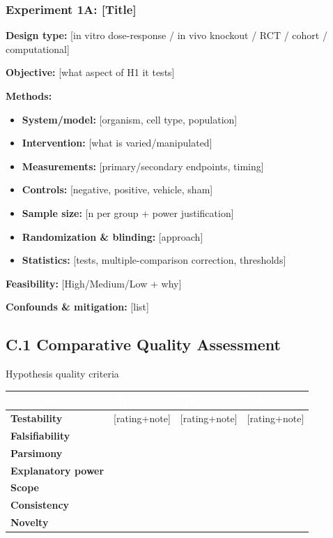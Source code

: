 \documentclass[11pt,letterpaper]{article}
\begin{document}
\subsubsection*{Experiment 1A: [Title]}
\textbf{Design type:} [in vitro dose-response / in vivo knockout / RCT / cohort / computational]\par
\textbf{Objective:} [what aspect of H1 it tests]\par
\textbf{Methods:}
\begin{itemize}
  \item \textbf{System/model:} [organism, cell type, population]
  \item \textbf{Intervention:} [what is varied/manipulated]
  \item \textbf{Measurements:} [primary/secondary endpoints, timing]
  \item \textbf{Controls:} [negative, positive, vehicle, sham]
  \item \textbf{Sample size:} [n per group + power justification]
  \item \textbf{Randomization \& blinding:} [approach]
  \item \textbf{Statistics:} [tests, multiple-comparison correction, thresholds]
\end{itemize}
\textbf{Feasibility:} [High/Medium/Low + why]\par
\textbf{Confounds \& mitigation:} [list]

\newpage
{}
\subsection*{C.1 Comparative Quality Assessment}
\begin{hypotable}{Hypothesis quality criteria}
\begin{tabular}{|p{2.5cm}|p{3cm}|p{3cm}|p{3cm}|}
\hline\tableheadercolor
\textcolor{white}{\textbf{Criterion}} & \textcolor{white}{\textbf{H1}} & \textcolor{white}{\textbf{H2}} & \textcolor{white}{\textbf{H3}}\\\hline
\textbf{Testability} & [rating+note] & [rating+note] & [rating+note]\\\hline
\tablerowcolor \textbf{Falsifiability} & & & \\\hline
\textbf{Parsimony} & & & \\\hline
\tablerowcolor \textbf{Explanatory power} & & & \\\hline
\textbf{Scope} & & & \\\hline
\tablerowcolor \textbf{Consistency} & & & \\\hline
\textbf{Novelty} & & & \\\hline
\end{tabular}
\caption{Strong = meets well; Moderate = partial; Weak = does not meet well.}
\end{hypotable}
\end{document}
